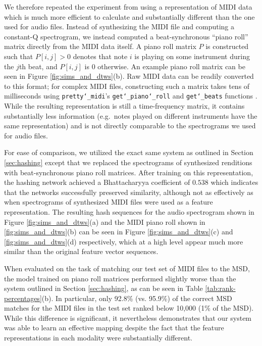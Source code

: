 \documentclass{article} %
\begin{document}
We therefore repeated the experiment from \cite{raffel2015large} using a representation of MIDI data which is much more efficient to calculate and substantially different than the one used for audio files.
Instead of synthesizing the MIDI file and computing a constant-Q spectrogram, we instead computed a beat-synchronous ``piano roll'' matrix directly from the MIDI data itself.
A piano roll matrix $P$ is constructed such that $P[i, j] > 0$ denotes that note $i$ is playing on some instrument during the $j$th beat, and $P[i, j]$ is $0$ otherwise.
An example piano roll matrix can be seen in Figure \ref{fig:sims_and_dtws}(b).
Raw MIDI data can be readily converted to this format; for complex MIDI files, constructing such a matrix takes tens of milliseconds using \texttt{pretty\char`_midi}'s \texttt{get\char`_piano\char`_roll} and \texttt{get\char`_beats} functions \cite{raffel2014pretty_midi}.
While the resulting representation is still a time-frequency matrix, it contains substantially less information (e.g.\ notes played on different instruments have the same representation) and is not directly comparable to the spectrograms we used for audio files.

For ease of comparison, we utilized the exact same system as outlined in Section \ref{sec:hashing} except that we replaced the spectrograms of synthesized renditions with beat-synchronous piano roll matrices.
After training on this representation, the hashing network achieved a Bhattacharyya coefficient of $0.538$ which indicates that the networks successfully preserved similarity, although not as effectively as when spectrograms of synthesized MIDI files were used as a feature representation.
The resulting hash sequences for the audio spectrogram shown in Figure \ref{fig:sims_and_dtws}(a) and the MIDI piano roll shown in \ref{fig:sims_and_dtws}(b) can be seen in Figure \ref{fig:sims_and_dtws}(c) and \ref{fig:sims_and_dtws}(d) respectively, which at a high level appear much more similar than the original feature vector sequences.

When evaluated on the task of matching our test set of MIDI files to the MSD, the model trained on piano roll matrices performed slightly worse than the system outlined in Section \ref{sec:hashing}, as can be seen in Table \ref{tab:rank-percentages}(b).
In particular, only 92.8\% (vs. 95.9\%) of the correct MSD matches for the MIDI files in the test set ranked below 10,000 (1\% of the MSD).
While this difference is significant, it nevertheless demonstrates that our system was able to learn an effective mapping despite the fact that the feature representations in each modality were substantially different.
\end{document}
